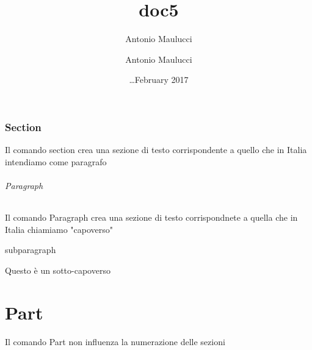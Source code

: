 \documentclass{article}
\title{doc5}
\author{Antonio Maulucci \and Antonio Maulucci}
\date{\dots February 2017}
\begin{document}
\maketitle


%
%
\section{Section}

Il comando section crea una sezione di testo corrispondente a quello che in Italia intendiamo come paragrafo

\paragraph{Paragraph}

Il comando Paragraph crea una sezione di testo corrispondnete a quella che in Italia chiamiamo "capoverso"

\subparagraph{subparagraph}

Questo è un sotto-capoverso

\part{Part}

Il comando Part non influenza la numerazione delle sezioni
\end{document}
